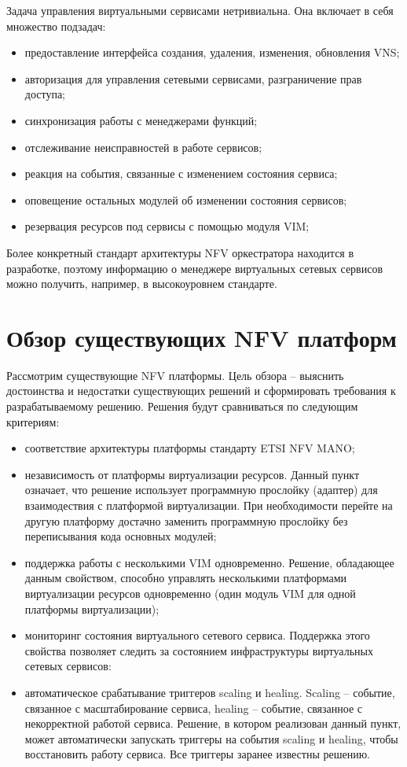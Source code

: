 \documentclass[oneside,final,14pt,a4paper]{extreport}
\begin{document}
Задача управления виртуальными сервисами нетривиальна. Она включает в себя множество подзадач:

\begin{itemize}
	\item предоставление интерфейса создания, удаления, изменения, обновления VNS;
	\item авторизация для управления сетевыми сервисами, разграничение прав доступа;
	\item синхронизация работы с менеджерами функций;
	\item отслеживание неисправностей в работе сервисов;
	\item реакция на события, связанные с изменением состояния сервиса;
	\item оповещение остальных модулей об изменении состояния сервисов;
	\item резервация ресурсов под сервисы с помощью модуля VIM;
\end{itemize}

Более конкретный стандарт архитектуры NFV оркестратора находится в разработке, поэтому информацию о менеджере виртуальных сетевых сервисов можно получить, например, в высокоуровнем стандарте.~\cite{nfv-mano-official-2016-04}





\chapter{Обзор существующих NFV платформ}
\label{nfv_platform_overview}
Рассмотрим существующие NFV платформы. Цель обзора -- выяснить достоинства и недостатки существующих решений и сформировать требования к разрабатываемому решению. Решения будут сравниваться по следующим критериям:
\begin{itemize}
	\item соответствие архитектуры платформы стандарту ETSI NFV MANO;
	\item независимость от платформы виртуализации ресурсов. Данный пункт означает, что решение использует программную прослойку (адаптер) для взаимодествия с платформой виртуализации. При необходимости перейте на другую платформу достачно заменить программную прослойку без переписывания кода основных модулей;
	\item поддержка работы с несколькими VIM одновременно. Решение, обладающее данным свойством, способно управлять несколькими платформами виртуализации ресурсов одновременно (один модуль VIM для одной платформы виртуализации);
	\item мониторинг состояния виртуального сетевого сервиса. Поддержка этого свойства позволяет следить за состоянием инфраструктуры виртуальных сетевых сервисов:
	\item автоматическое срабатывание триггеров scaling и healing. Scaling -- событие, связанное с масштабирование сервиса, healing -- событие, связанное с некорректной работой сервиса. Решение, в котором реализован данный пункт, может автоматически запускать триггеры на события scaling и healing, чтобы восстановить работу сервиса. Все триггеры заранее известны решению.
\end{itemize}
\end{document}
